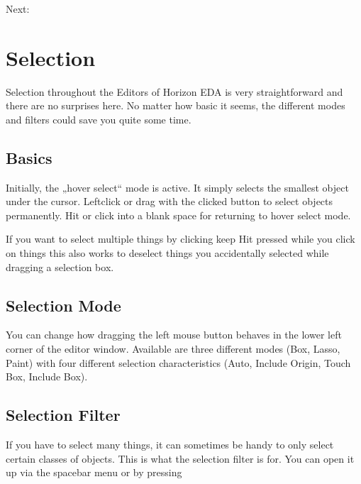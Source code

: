 \documentclass[letterpaper,10pt,czech]{sphinxmanual}
\begin{document}
Next: {\hyperref[\detokenize{selection::doc}]{}}


\chapter{Selection}
\label{\detokenize{selection:selection}}\label{\detokenize{selection::doc}}
Selection throughout the Editors of Horizon EDA is very straightforward and there are no surprises here. No matter how basic it seems, the different modes and filters could save you quite some time.


\section{Basics}
\label{\detokenize{selection:basics}}
\noindent{}

Initially, the „hover select“ mode is active. It simply selects the
smallest object under the cursor. Leftclick or drag with the clicked button to select objects permanently. Hit  or click into a blank space for returning to hover select mode.

If you want to select multiple things by clicking keep Hit  pressed while you click on things \textendash{} this also works to deselect things you accidentally selected while dragging a selection box.


\section{Selection Mode}
\label{\detokenize{selection:selection-mode}}
\noindent{}

You can change how dragging the left mouse button behaves in the lower left corner of the editor window. Available are three different modes (Box, Lasso, Paint) with four different selection characteristics (Auto, Include Origin, Touch Box, Include Box).


\section{Selection Filter}
\label{\detokenize{selection:selection-filter}}
\noindent{}

If you have to select many things, it can sometimes be handy to only select certain classes of objects. This is what the selection filter is for. You can open it up via the spacebar menu or by pressing 
\end{document}
